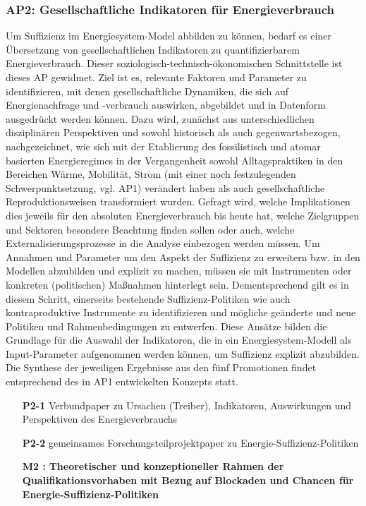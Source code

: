 \documentclass[a4paper,11pt,twoside]{scrartcl}
\begin{document}
\subsubsection*{AP2: Gesellschaftliche Indikatoren für Energieverbrauch}
Um Suffizienz im Energiesystem-Model abbilden zu können, bedarf es einer Übersetzung von gesellschaftlichen Indikatoren zu quantifizierbarem Energieverbrauch. Dieser soziologisch-technisch-ökonomischen Schnittstelle ist dieses AP gewidmet. Ziel ist es, relevante Faktoren und Parameter zu identifizieren, mit denen gesellschaftliche Dynamiken, die sich auf Energienachfrage und -verbrauch auswirken, abgebildet und in Datenform ausgedrückt werden können. Dazu wird, zunächst aus unterschiedlichen disziplinären Perspektiven und sowohl historisch als auch gegenwartsbezogen, nachgezeichnet, wie sich mit der Etablierung des fossilistisch und atomar basierten Energieregimes in der Vergangenheit sowohl Alltagspraktiken in den Bereichen Wärme, Mobilität, Strom (mit einer noch festzulegenden Schwerpunktsetzung, vgl. AP1) verändert haben als auch gesellschaftliche Reproduktionsweisen transformiert wurden. Gefragt wird, welche Implikationen dies jeweils für den absoluten Energieverbrauch bis heute hat, welche Zielgruppen und Sektoren besondere Beachtung finden sollen oder auch, welche Externalisierungsprozesse in die Analyse einbezogen werden müssen. Um Annahmen und Parameter um den Aspekt der Suffizienz zu erweitern bzw. in den Modellen abzubilden und explizit zu machen, müssen sie mit Instrumenten oder konkreten (politischen) Maßnahmen hinterlegt sein. Dementsprechend gilt es in diesem Schritt, einerseits bestehende Suffizienz-Politiken wie auch kontraproduktive Instrumente zu identifizieren und mögliche geänderte und neue Politiken und Rahmenbedingungen zu entwerfen. 
Diese Ansätze bilden die Grundlage für die Auswahl der Indikatoren, die in ein Energiesystem-Modell als Input-Parameter aufgenommen werden können, um Suffizienz explizit abzubilden. Die Synthese der jeweiligen Ergebnisse aus den fünf Promotionen findet entsprechend des in AP1 entwickelten Konzepts statt. 

\begin{itemize}
    \item[\textbf{P2-1}] Verbundpaper zu Ursachen (Treiber), Indikatoren, Auswirkungen und Perspektiven des Energieverbrauchs 
    \item[\textbf{P2-2}] gemeinsames Forschungsteilprojektpaper zu Energie-Suffizienz-Politiken 
    \item[\textbf{M2 :}] \textbf{Theoretischer und konzeptioneller Rahmen der Qualifikationsvorhaben mit Bezug auf Blockaden und Chancen für Energie-Suffizienz-Politiken}
\end{itemize}
\end{document}
